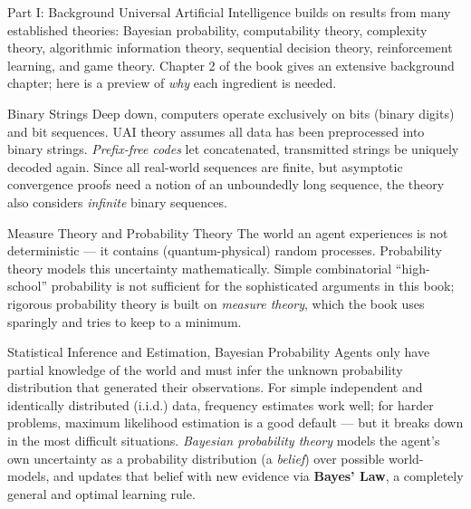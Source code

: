 \documentclass[aspectratio=169,10pt]{beamer}
\begin{document}
\begin{frame}[allowframebreaks]{Part I: Background}
  Universal Artificial Intelligence builds on results from many established
  theories: Bayesian probability, computability theory, complexity theory,
  algorithmic information theory, sequential decision theory, reinforcement
  learning, and game theory. Chapter 2 of the book gives an extensive
  background chapter; here is a preview of \emph{why} each ingredient is
  needed.

  \begin{block}{Binary Strings}
    Deep down, computers operate exclusively on bits (binary digits) and bit
    sequences. UAI theory assumes all data has been preprocessed into binary
    strings. \emph{Prefix-free codes} let concatenated, transmitted strings
    be uniquely decoded again. Since all real-world sequences are finite, but
    asymptotic convergence proofs need a notion of an unboundedly long
    sequence, the theory also considers \emph{infinite} binary sequences.
  \end{block}

  \framebreak

  \begin{block}{Measure Theory and Probability Theory}
    The world an agent experiences is not deterministic --- it contains
    (quantum-physical) random processes. Probability theory models this
    uncertainty mathematically. Simple combinatorial ``high-school''
    probability is not sufficient for the sophisticated arguments in this
    book; rigorous probability theory is built on \emph{measure theory},
    which the book uses sparingly and tries to keep to a minimum.
  \end{block}

  \begin{block}{Statistical Inference and Estimation, Bayesian Probability}
    Agents only have partial knowledge of the world and must infer the
    unknown probability distribution that generated their observations. For
    simple independent and identically distributed (i.i.d.) data, frequency
    estimates work well; for harder problems, maximum likelihood estimation
    is a good default --- but it breaks down in the most difficult
    situations. \emph{Bayesian probability theory} models the agent's own
    uncertainty as a probability distribution (a \emph{belief}) over
    possible world-models, and updates that belief with new evidence via
    \textbf{Bayes' Law}, a completely general and optimal learning rule.
  \end{block}


\end{frame}
\end{document}
